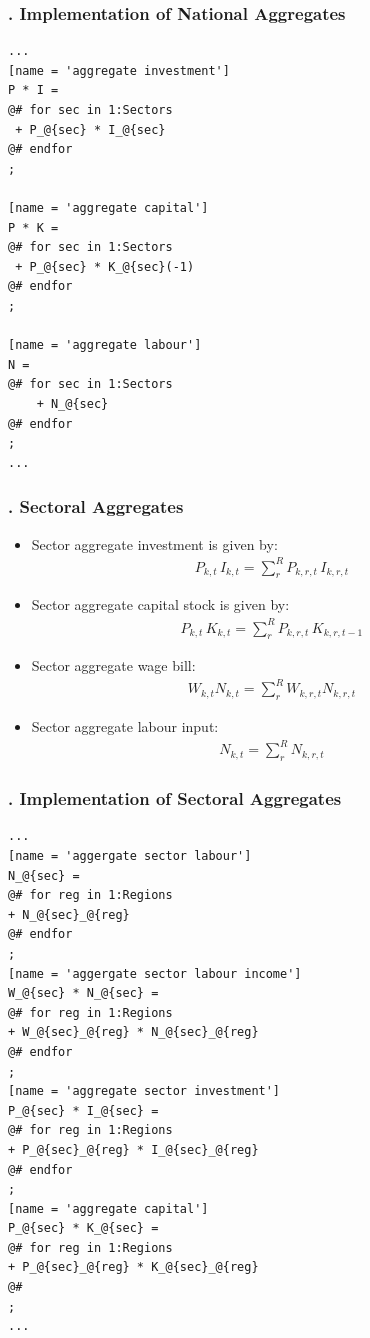 \documentclass[11pt,aspectratio=169]{beamer}
\begin{document}
\begin{frame}[fragile]
\frametitle{{\thesection.\thesubsection} Implementation of National Aggregates}

\begin{lstlisting}[frame = single]
...
[name = 'aggregate investment']
P * I = 
@# for sec in 1:Sectors
 + P_@{sec} * I_@{sec}
@# endfor
;

[name = 'aggregate capital']
P * K = 
@# for sec in 1:Sectors
 + P_@{sec} * K_@{sec}(-1)
@# endfor
;

[name = 'aggregate labour']
N = 
@# for sec in 1:Sectors
    + N_@{sec}
@# endfor
;
...
\end{lstlisting}
\end{frame}

\begin{frame}
\frametitle{{\thesection.\thesubsection} Sectoral Aggregates}
\scriptsize
\begin{itemize}
\item Sector aggregate investment is given by:
\begin{align*}
P_{k,t} \, I_{k,t} = \sum_{r}^{R} P_{k,r,t} \, I_{k,r,t}
\end{align*}
\item Sector aggregate capital stock is given by:
\begin{align*}
P_{k,t} \, K_{k,t} = \sum_{r}^{R} P_{k,r,t} \, K_{k,r,t-1}
\end{align*}
\item Sector aggregate wage bill:
\begin{align*}
W_{k,t} N_{k,t} = \sum_{r}^{R}  W_{k,r,t} N_{k,r,t}
\end{align*}
\item Sector aggregate labour input:
\begin{align*}
N_{k,t} = \sum_{r}^{R} N_{k,r,t}
\end{align*}
\end{itemize}
\end{frame}

\begin{frame}[fragile]
\frametitle{{\thesection.\thesubsection} Implementation of Sectoral Aggregates}

\begin{lstlisting}[frame = single]
...
[name = 'aggergate sector labour']
N_@{sec} = 
@# for reg in 1:Regions
+ N_@{sec}_@{reg}
@# endfor
;
[name = 'aggergate sector labour income']
W_@{sec} * N_@{sec} = 
@# for reg in 1:Regions
+ W_@{sec}_@{reg} * N_@{sec}_@{reg}
@# endfor
;
[name = 'aggregate sector investment']
P_@{sec} * I_@{sec} = 
@# for reg in 1:Regions
+ P_@{sec}_@{reg} * I_@{sec}_@{reg}
@# endfor
;
[name = 'aggregate capital']
P_@{sec} * K_@{sec} = 
@# for reg in 1:Regions
+ P_@{sec}_@{reg} * K_@{sec}_@{reg}
@#
;
...
\end{lstlisting}
\end{frame}
\end{document}

